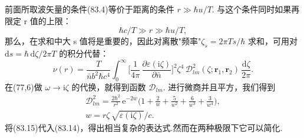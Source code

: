 前面所取波矢量的条件(83.4)等价于距离的条件 $r\gg\hbar u/T$. 与这个条件同时如果再限定 r 值的上限：
\begin{equation}
  \hbar c/T\gg r\gg\hbar u/T,
\end{equation}
那么，在求和中大 s 值将是重要的，因此对离散"频率"$\zeta_s=2\pi Ts/\hbar$ 求和，可用对 $\mathrm{d}s=\hbar\,\mathrm{d}\zeta/2\pi T$ 的积分代替：
\begin{equation}
  \nu(r)=\frac{T}{\bar{n}b^{2}\hbar c^{4}}\int_{0}^{\infty}\biggl[\frac{1}{4\pi}\,\frac{\partial\varepsilon(\mathrm{i}\zeta)}{\partial\bar{n}}\biggr]^{2}\zeta^{4}\,\mathcal{D}^{2}_{lm}(\zeta;\bm{r}_1,\bm{r}_2)\,\frac{\mathrm{d}\zeta}{2\pi}.
\end{equation}
在(77,6)做 $\omega\to\mathrm{i}\zeta$ 的代换，就得到函数 $\mathcal{D}_{lm}$. 进行微商并且平方，我们得到
\begin{equation}
  \begin{gathered}
    \mathcal{D}^{2}_{lm}=\frac{2\hbar^{2}}{r^{2}}\,\mathrm{e}^{-2w}\biggl(1+\frac{2}{w}+\frac{5}{w^{2}}+\frac{6}{w^{3}}+\frac{3}{w^{4}}\biggr),\\
    w=r\zeta\,\sqrt{\varepsilon(\mathrm{i}\zeta)}/c.
  \end{gathered}
\end{equation}
将(83.15)代入(83.14)，得出相当复杂的表达式.然而在两种极限下它可以简化.

